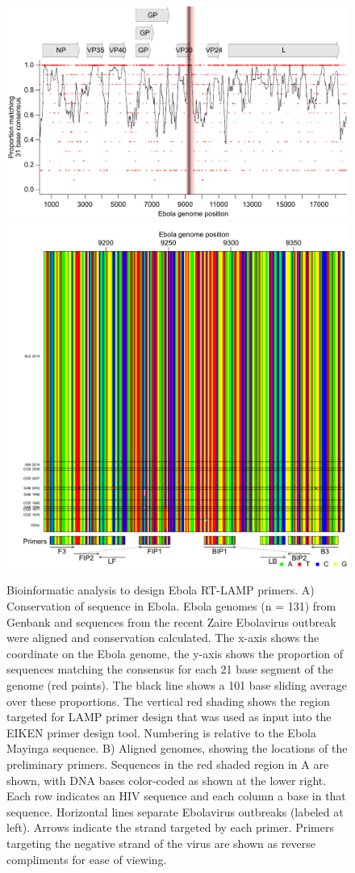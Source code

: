 \documentclass[../sherrill-Mix_thesis.tex]{subfiles}
\begin{document}
	\begin{figure}
		\centering
		\includegraphics[width=.6\textwidth]{ebolaConsensus.pdf} %
		\includegraphics[width=.6\textwidth]{loop_bases.pdf} %
		\caption[Ebola RT-LAMP primers design]{Bioinformatic analysis to design Ebola RT-LAMP primers. A) Conservation of sequence in Ebola. Ebola genomes (n = 131) from Genbank and sequences from the recent Zaire Ebolavirus outbreak \citep{Gire2014} were aligned and conservation calculated. The x-axis shows the coordinate on the Ebola genome, the y-axis shows the proportion of sequences matching the consensus for each 21 base segment of the genome (red points). The black line shows a 101 base sliding average over these proportions. The vertical red shading shows the region targeted for LAMP primer design that was used as input into the EIKEN primer design tool. Numbering is relative to the Ebola Mayinga sequence. B) Aligned genomes, showing the locations of the preliminary primers. Sequences in the red shaded region in A are shown, with DNA bases color-coded as shown at the lower right. Each row indicates an HIV sequence and each column a base in that sequence. Horizontal lines separate Ebolavirus outbreaks (labeled at left). Arrows indicate the strand targeted by each primer. Primers targeting the negative strand of the virus are shown as reverse compliments for ease of viewing.}
		\label{figEbolaConsensus}
	\end{figure}
\end{document}
